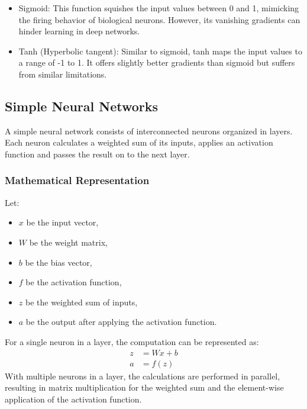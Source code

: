 \documentclass{article}
\begin{document}
\begin{itemize}
    \item[\ding{118}] Sigmoid:
          This function squishes the input values between 0 and 1, mimicking the firing behavior of biological neurons. However, its vanishing gradients can hinder learning in deep networks.
\end{itemize}

\begin{itemize}
    \item[\ding{118}] Tanh (Hyperbolic tangent):
          Similar to sigmoid, tanh maps the input values to a range of -1 to 1. It offers slightly better gradients than sigmoid but suffers from similar limitations.
\end{itemize}
\newpage

\subsection{Simple Neural Networks}
A simple neural network consists of interconnected neurons organized in layers. Each neuron calculates a weighted sum of its inputs, applies an activation function and passes the result on to the next layer.
\subsubsection{Mathematical Representation}

Let:
\begin{itemize}
    \item \( x \) be the input vector,
    \item \( W \) be the weight matrix,
    \item \( b \) be the bias vector,
    \item \( f \) be the activation function,
    \item \( z \) be the weighted sum of inputs,
    \item \( a \) be the output after applying the activation function.
\end{itemize}

For a single neuron in a layer, the computation can be represented as:
\begin{align*}
    z & = Wx + b \\
    a & = f(z)
\end{align*}
With multiple neurons in a layer, the calculations are performed in parallel, resulting in matrix multiplication for the weighted sum and the element-wise application of the activation function.
\end{document}
